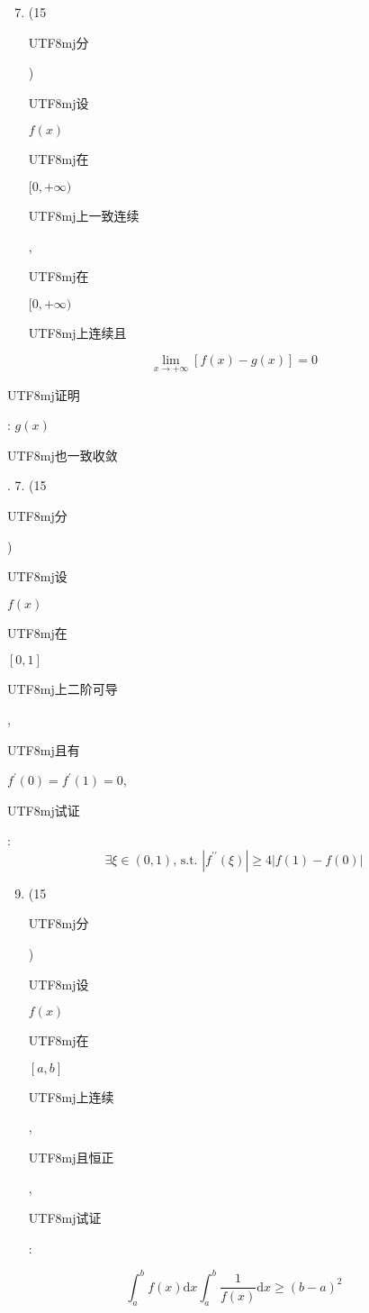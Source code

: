 \documentclass[10pt]{article}
\begin{document}
\begin{enumerate}
  \setcounter{enumi}{6}
  \item (15 \begin{CJK}{UTF8}{mj}分\end{CJK}) \begin{CJK}{UTF8}{mj}设\end{CJK} $f(x)$ \begin{CJK}{UTF8}{mj}在\end{CJK} $[0,+\infty)$ \begin{CJK}{UTF8}{mj}上一致连续\end{CJK}, \begin{CJK}{UTF8}{mj}在\end{CJK} $[0,+\infty)$ \begin{CJK}{UTF8}{mj}上连续且\end{CJK}
\end{enumerate}
$$
\lim _{x \rightarrow+\infty}[f(x)-g(x)]=0
$$
\begin{CJK}{UTF8}{mj}证明\end{CJK}: $g(x)$ \begin{CJK}{UTF8}{mj}也一致收敛\end{CJK}. 7. (15 \begin{CJK}{UTF8}{mj}分\end{CJK}) \begin{CJK}{UTF8}{mj}设\end{CJK} $f(x)$ \begin{CJK}{UTF8}{mj}在\end{CJK} $[0,1]$ \begin{CJK}{UTF8}{mj}上二阶可导\end{CJK}, \begin{CJK}{UTF8}{mj}且有\end{CJK} $f^{\prime}(0)=f^{\prime}(1)=0$, \begin{CJK}{UTF8}{mj}试证\end{CJK}:
$$
\exists \xi \in(0,1) \text {, s.t. }\left|f^{\prime \prime}(\xi)\right| \geq 4|f(1)-f(0)|
$$

\begin{enumerate}
  \setcounter{enumi}{8}
  \item (15 \begin{CJK}{UTF8}{mj}分\end{CJK}) \begin{CJK}{UTF8}{mj}设\end{CJK} $f(x)$ \begin{CJK}{UTF8}{mj}在\end{CJK} $[a, b]$ \begin{CJK}{UTF8}{mj}上连续\end{CJK}, \begin{CJK}{UTF8}{mj}且恒正\end{CJK}, \begin{CJK}{UTF8}{mj}试证\end{CJK}:
\end{enumerate}
$$
\int_{a}^{b} f(x) \mathrm{d} x \int_{a}^{b} \frac{1}{f(x)} \mathrm{d} x \geq(b-a)^{2}
$$
\end{document}
